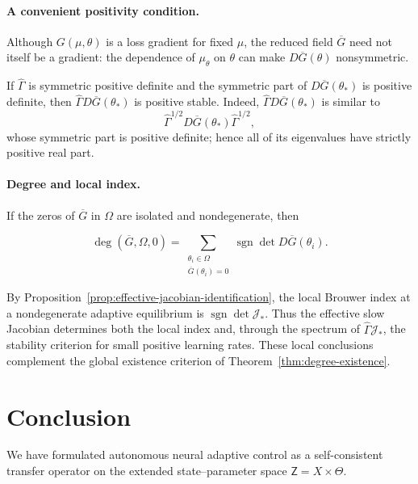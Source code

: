 \documentclass[11pt]{article}
\theoremstyle{definition}
\theoremstyle{remark}
\newcommand{\ProbThetaOne}{\mathcal{P}_{\Theta}^{1}}
\newcommand{\STO}{\mathcal{L}}
\newcommand{\ThetaSet}{\Theta}
\newcommand{\Gammahat}{\widehat{\Gamma}}
\newcommand{\Z}{\mathsf{Z}}
\newcommand{\Mmono}{\mathscr{M}_{\mathrm{mono}}}
\begin{document}
{\paragraph{A convenient positivity condition.}
Although $G(\mu,\theta)$ is a loss gradient for fixed $\mu$,
the reduced field $\overline G$ need not itself be a gradient:
the dependence of $\mu_\theta$ on $\theta$ can make
$D\overline G(\theta)$ nonsymmetric.

If \(\Gammahat\) is symmetric positive definite and the symmetric part of
\(D\overline G(\theta_*)\) is positive definite, then
\(\Gammahat D\overline G(\theta_*)\) is positive stable.  Indeed,
\(\Gammahat D\overline G(\theta_*)\) is similar to
\[
  \Gammahat^{1/2}
  D\overline G(\theta_*)
  \Gammahat^{1/2},
\]
whose symmetric part is positive definite; hence all of its eigenvalues have
strictly positive real part.

\paragraph{Degree and local index.}
If the zeros of \(\overline G\) in \(\Omega\) are isolated and
nondegenerate, then

\[
  \deg(\overline G,\Omega,0)
  =
  \sum_{\substack{\theta_i\in\Omega\\
                   \overline G(\theta_i)=0}}
  \operatorname{sgn}\det D\overline G(\theta_i).
\]

By Proposition~\ref{prop:effective-jacobian-identification},
the local Brouwer index at a nondegenerate adaptive
equilibrium is $\operatorname{sgn}\det\mathcal J_*$.
Thus the effective slow Jacobian determines both
the local index and, through the spectrum of
$\Gammahat\mathcal J_*$, the stability criterion
for small positive learning rates.
These local conclusions complement the global
existence criterion of Theorem~\ref{thm:degree-existence}.





\section{Conclusion} \label{9}

We have formulated autonomous neural adaptive control as a self-consistent transfer operator on the extended state--parameter space $\Z=X\times\ThetaSet$. 

}
\end{document}
